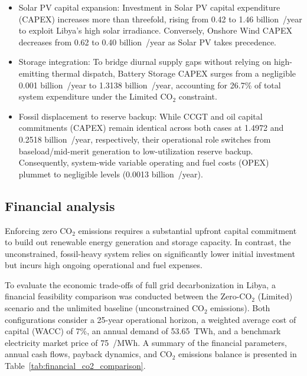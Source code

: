 \documentclass[preprint,12pt]{elsarticle}
\begin{document}
\begin{itemize}
    \item {Solar PV capital expansion:} Investment in Solar PV capital expenditure (CAPEX) increases more than threefold, rising from 0.42 to 1.46 billion~\texteuro/year to exploit Libya's high solar irradiance. Conversely, Onshore Wind CAPEX decreases from 0.62 to 0.40 billion~\texteuro/year as Solar PV takes precedence.
    \item {Storage integration:} To bridge diurnal supply gaps without relying on high-emitting thermal dispatch, Battery Storage CAPEX surges from a negligible 0.001 billion~\texteuro/year to 1.3138 billion~\texteuro/year, accounting for 26.7\% of total system expenditure under the Limited $\text{CO}_2$ constraint.
    \item {Fossil displacement to reserve backup:} While CCGT and oil capital commitments (CAPEX) remain identical across both cases at 1.4972 and 0.2518 billion~\texteuro/year, respectively, their operational role switches from baseload/mid-merit generation to low-utilization reserve backup. Consequently, system-wide variable operating and fuel costs (OPEX) plummet to negligible levels (0.0013 billion~\texteuro/year).
\end{itemize}
\subsection{Financial analysis}
Enforcing zero $\text{CO}_2$ emissions requires a substantial upfront capital commitment to build out renewable energy generation and storage capacity. In contrast, the unconstrained, fossil-heavy system relies on significantly lower initial investment but incurs high ongoing operational and fuel expenses. 

To evaluate the economic trade-offs of full grid decarbonization in Libya, a financial feasibility comparison was conducted between the {Zero-$\text{CO}_2$ (Limited)} scenario and the unlimited baseline (unconstrained $\text{CO}_2$ emissions). Both configurations consider a 25-year operational horizon, a weighted average cost of capital (WACC) of 7\%, an annual demand of 53.65~TWh, and a benchmark electricity market price of 75~\texteuro/MWh. A summary of the financial parameters, annual cash flows, payback dynamics, and $\text{CO}_2$ emissions balance is presented in Table~\ref{tab:financial_co2_comparison}.
\end{document}
